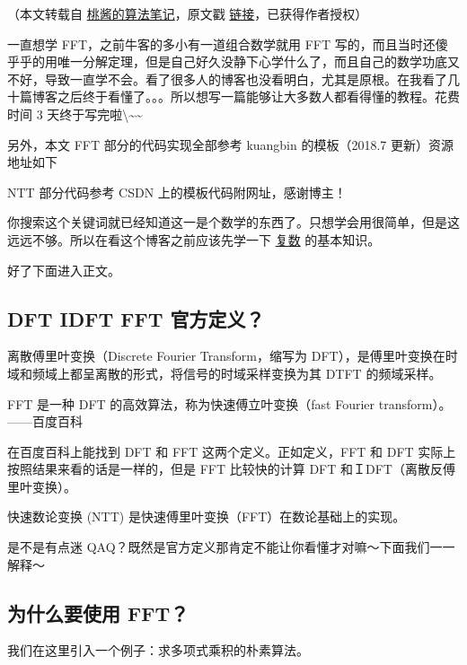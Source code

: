 
（本文转载自 \href{https://zhuanlan.zhihu.com/c_1005817911142838272}{桃酱的算法笔记}，原文戳 \href{https://zhuanlan.zhihu.com/p/41867199}{链接}，已获得作者授权）

一直想学 FFT，之前牛客的多小有一道组合数学就用 FFT 写的，而且当时还傻乎乎的用唯一分解定理，但是自己好久没静下心学什么了，而且自己的数学功底又不好，导致一直学不会。看了很多人的博客也没看明白，尤其是原根。在我看了几十篇博客之后终于看懂了。。。所以想写一篇能够让大多数人都看得懂的教程。花费时间 3 天终于写完啦\st{}\textbackslash{}\textasciitilde{}\textasciitilde{}

另外，本文 FFT 部分的代码实现全部参考 kuangbin 的模板（2018.7 更新）资源地址如下

\href{https://download.csdn.net/download/qq_37136305/10562410}{}

NTT 部分代码参考 CSDN 上的模板代码附网址，感谢博主！

你搜索这个关键词就已经知道这一是个数学的东西了。只想学会用很简单，但是这远远不够。所以在看这个博客之前应该先学一下 \href{/math/complex}{复数} 的基本知识。

好了下面进入正文。

\subsection{DFT IDFT FFT 官方定义？}

\begin{QUOTE}{}{}
离散傅里叶变换（Discrete Fourier Transform，缩写为 DFT），是傅里叶变换在时域和频域上都呈离散的形式，将信号的时域采样变换为其 DTFT 的频域采样。



FFT 是一种 DFT 的高效算法，称为快速傅立叶变换（fast Fourier transform）。 ——百度百科
\end{QUOTE}

在百度百科上能找到 DFT 和 FFT 这两个定义。正如定义，FFT 和 DFT 实际上按照结果来看的话是一样的，但是 FFT 比较快的计算 DFT 和ＩDFT（离散反傅里叶变换）。

快速数论变换 (NTT) 是快速傅里叶变换（FFT）在数论基础上的实现。

是不是有点迷 QAQ？既然是官方定义那肯定不能让你看懂才对嘛～下面我们一一解释～

\subsection{为什么要使用 FFT？}

我们在这里引入一个例子：求多项式乘积的朴素算法。

